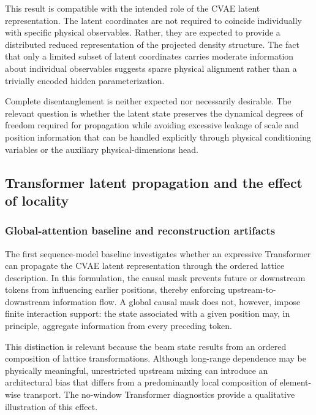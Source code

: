 \documentclass[11pt,a4paper]{article}
\begin{document}
\begin{sloppypar}
This result is compatible with the intended role of the CVAE latent representation. The latent coordinates are not required to coincide individually with specific physical observables. Rather, they are expected to provide a distributed reduced representation of the projected density structure. The fact that only a limited subset of latent coordinates carries moderate information about individual observables suggests sparse physical alignment rather than a trivially encoded hidden parameterization.

Complete disentanglement is neither expected nor necessarily desirable. The relevant question is whether the latent state preserves the dynamical degrees of freedom required for propagation while avoiding excessive leakage of scale and position information that can be handled explicitly through physical conditioning variables or the auxiliary physical-dimensions head.

\subsection{Transformer latent propagation and the effect of locality}
\label{subsec:results_transformer_locality}

\subsubsection{Global-attention baseline and reconstruction artifacts}
\label{subsubsec:results_nowindow_transformer}

The first sequence-model baseline investigates whether an expressive Transformer can propagate the CVAE latent representation through the ordered lattice description. In this formulation, the causal mask prevents future or downstream tokens from influencing earlier positions, thereby enforcing upstream-to-downstream information flow. A global causal mask does not, however, impose finite interaction support: the state associated with a given position may, in principle, aggregate information from every preceding token.

This distinction is relevant because the beam state results from an ordered composition of lattice transformations. Although long-range dependence may be physically meaningful, unrestricted upstream mixing can introduce an architectural bias that differs from a predominantly local composition of element-wise transport. The no-window Transformer diagnostics provide a qualitative illustration of this effect.


\end{sloppypar}
\end{document}
